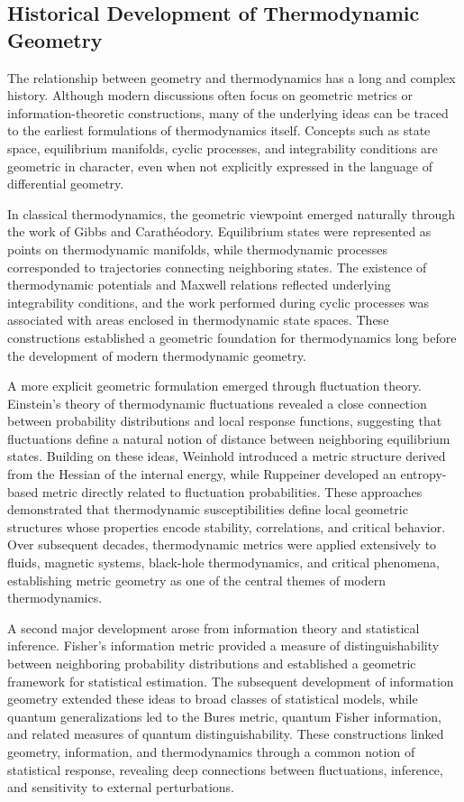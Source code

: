\subsection{Historical Development of Thermodynamic Geometry}

The relationship between geometry and thermodynamics has a long and complex history. Although modern discussions often focus on geometric metrics or information-theoretic constructions, many of the underlying ideas can be traced to the earliest formulations of thermodynamics itself. Concepts such as state space, equilibrium manifolds, cyclic processes, and integrability conditions are geometric in character, even when not explicitly expressed in the language of differential geometry.

In classical thermodynamics, the geometric viewpoint emerged naturally through the work of Gibbs and Carathéodory. Equilibrium states were represented as points on thermodynamic manifolds, while thermodynamic processes corresponded to trajectories connecting neighboring states. The existence of thermodynamic potentials and Maxwell relations reflected underlying integrability conditions, and the work performed during cyclic processes was associated with areas enclosed in thermodynamic state spaces. These constructions established a geometric foundation for thermodynamics long before the development of modern thermodynamic geometry.

A more explicit geometric formulation emerged through fluctuation theory. Einstein’s theory of thermodynamic fluctuations revealed a close connection between probability distributions and local response functions, suggesting that fluctuations define a natural notion of distance between neighboring equilibrium states. Building on these ideas, Weinhold introduced a metric structure derived from the Hessian of the internal energy, while Ruppeiner developed an entropy-based metric directly related to fluctuation probabilities. These approaches demonstrated that thermodynamic susceptibilities define local geometric structures whose properties encode stability, correlations, and critical behavior. Over subsequent decades, thermodynamic metrics were applied extensively to fluids, magnetic systems, black-hole thermodynamics, and critical phenomena, establishing metric geometry as one of the central themes of modern thermodynamics.

A second major development arose from information theory and statistical inference. Fisher’s information metric provided a measure of distinguishability between neighboring probability distributions and established a geometric framework for statistical estimation. The subsequent development of information geometry extended these ideas to broad classes of statistical models, while quantum generalizations led to the Bures metric, quantum Fisher information, and related measures of quantum distinguishability. These constructions linked geometry, information, and thermodynamics through a common notion of statistical response, revealing deep connections between fluctuations, inference, and sensitivity to external perturbations.

